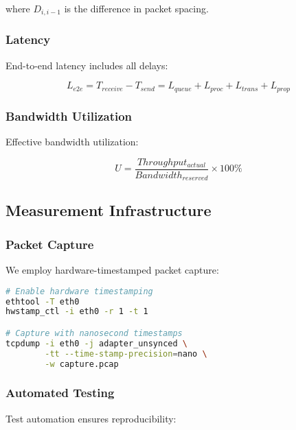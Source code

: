 \documentclass[10pt, journal, compsoc]{IEEEtran}
\begin{document}
where $D_{i,i-1}$ is the difference in packet spacing.

\subsubsection{Latency}

End-to-end latency includes all delays:

\begin{equation}
L_{e2e} = T_{receive} - T_{send} = L_{queue} + L_{proc} + L_{trans} + L_{prop}
\end{equation}

\subsubsection{Bandwidth Utilization}

Effective bandwidth utilization:

\begin{equation}
U = \frac{Throughput_{actual}}{Bandwidth_{reserved}} \times 100\%
\end{equation}

\subsection{Measurement Infrastructure}

\subsubsection{Packet Capture}

We employ hardware-timestamped packet capture:

\begin{lstlisting}[language=bash, caption=Packet Capture Setup]
# Enable hardware timestamping
ethtool -T eth0
hwstamp_ctl -i eth0 -r 1 -t 1

# Capture with nanosecond timestamps
tcpdump -i eth0 -j adapter_unsynced \
        -tt --time-stamp-precision=nano \
        -w capture.pcap
\end{lstlisting}

\subsubsection{Automated Testing}

Test automation ensures reproducibility:
\end{document}
